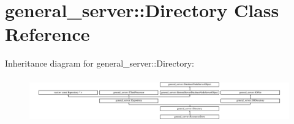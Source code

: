 \hypertarget{classgeneral__server_1_1Directory}{\section{general\-\_\-server\-:\-:\-Directory \-Class \-Reference}
\label{classgeneral__server_1_1Directory}
}
\-Inheritance diagram for general\-\_\-server\-:\-:\-Directory\-:\begin{figure}[H]
\begin{center}
\leavevmode
\includegraphics[height=1.966292cm]{classgeneral__server_1_1Directory}
\end{center}
\end{figure}
